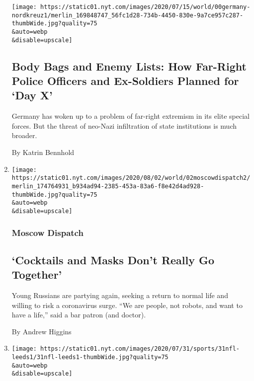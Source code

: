 \begin{enumerate}
  \texttt{[image: https://static01.nyt.com/images/2020/07/15/world/00germany-nordkreuz1/merlin\_169848747\_56fc1d28-734b-4450-830e-9a7ce957c287-thumbWide.jpg?quality=75\\\&auto=webp\\\&disable=upscale]}

  \hypertarget{body-bags-and-enemy-lists-how-far-right-police-officers-and-ex-soldiers-planned-for-day-x}{%
  \subsection{Body Bags and Enemy Lists: How Far-Right Police Officers
  and Ex-Soldiers Planned for `Day
  X'}\label{body-bags-and-enemy-lists-how-far-right-police-officers-and-ex-soldiers-planned-for-day-x}}

  Germany has woken up to a problem of far-right extremism in its elite
  special forces. But the threat of neo-Nazi infiltration of state
  institutions is much broader.

  By Katrin Bennhold
\item
  \href{/2020/08/01/world/europe/russia-moscow-coronaviru.html}{}

  \texttt{[image: https://static01.nyt.com/images/2020/08/02/world/02moscowdispatch2/merlin\_174764931\_b934ad94-2385-453a-83a6-f8e42d4ad928-thumbWide.jpg?quality=75\\\&auto=webp\\\&disable=upscale]}

  \hypertarget{moscow-dispatch}{%
  \subsubsection{Moscow Dispatch}\label{moscow-dispatch}}

  \hypertarget{cocktails-and-masks-dont-really-go-together}{%
  \subsection{`Cocktails and Masks Don't Really Go
  Together'}\label{cocktails-and-masks-dont-really-go-together}}

  Young Russians are partying again, seeking a return to normal life and
  willing to risk a coronavirus surge. ``We are people, not robots, and
  want to have a life,'' said a bar patron (and doctor).

  By Andrew Higgins
\item
  \href{/2020/07/31/sports/soccer/leeds-united-san-francisco-49ers.html}{}

  \texttt{[image: https://static01.nyt.com/images/2020/07/31/sports/31nfl-leeds1/31nfl-leeds1-thumbWide.jpg?quality=75\\\&auto=webp\\\&disable=upscale]}


\end{enumerate}
